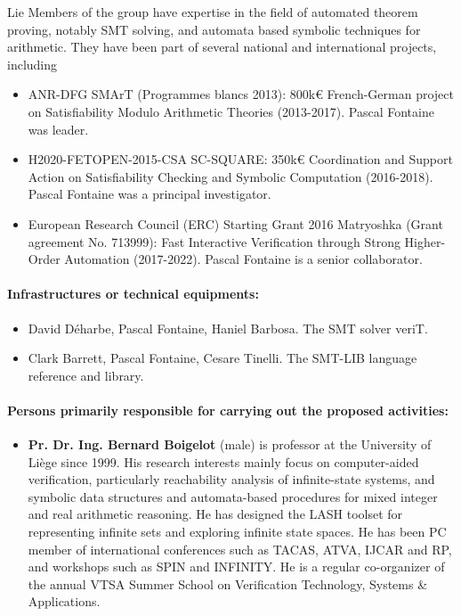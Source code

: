 \begin{sitedescription}{Lie}
Members of the group have expertise in the field of automated theorem proving, notably SMT solving, and automata based symbolic techniques for arithmetic.  They have been part of several national and international projects, including
\begin{itemize}
\item ANR-DFG SMArT (Programmes blancs 2013): 800k€ French-German project on Satisfiability Modulo Arithmetic Theories (2013-2017).  Pascal Fontaine was leader.
\item H2020-FETOPEN-2015-CSA SC-SQUARE: 350k€ Coordination and Support Action on Satisfiability Checking and Symbolic Computation (2016-2018).  Pascal Fontaine was a principal investigator.
\item European Research Council (ERC) Starting Grant 2016 Matryoshka (Grant
  agreement No. 713999): Fast Interactive Verification through Strong
  Higher-Order Automation (2017-2022).  Pascal Fontaine is a senior
  collaborator.
\end{itemize}

\paragraph{Infrastructures or technical equipments:}


\begin{itemize}
\item David Déharbe, Pascal Fontaine, Haniel Barbosa.  The SMT solver veriT.
\item Clark Barrett, Pascal Fontaine, Cesare Tinelli. The SMT-LIB language reference and library.
\end{itemize}

\paragraph{Persons primarily responsible for carrying out the proposed activities:}

\begin{itemize}
\item{\bf Pr. Dr. Ing. Bernard Boigelot} (male) is professor at the University of Liège
  since 1999.  His research interests mainly focus on computer-aided
  verification, particularly reachability analysis of infinite-state
  systems, and symbolic data structures and automata-based procedures
  for mixed integer and real arithmetic reasoning.  He has designed
  the LASH toolset for representing infinite sets and exploring
  infinite state spaces. He has been PC member of international
  conferences such as TACAS, ATVA, IJCAR and RP, and workshops such as
  SPIN and INFINITY. He is a regular co-organizer of the annual VTSA
  Summer School on Verification Technology, Systems \& Applications.


\end{itemize}
\end{sitedescription}
